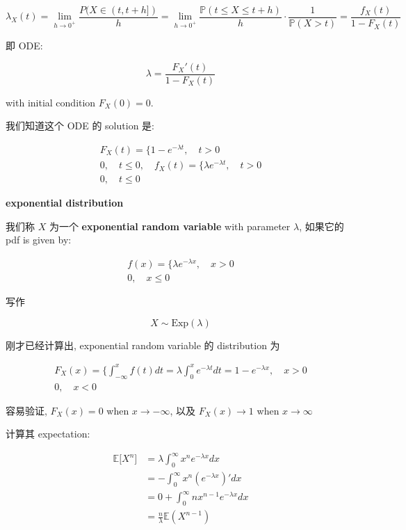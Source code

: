 \documentclass{qlnotes-export}
\begin{document}
\[\lambda_{X}(t) = \lim\limits_{h\rightarrow 0^{+}}\frac{P(X \in (t,t + h\rbrack)}{h} = \lim\limits_{h\rightarrow 0^{+}}\frac{{\mathbb{P}}(t \leq X \leq t + h)}{h} \cdot \frac{1}{{\mathbb{P}}(X > t)} = \frac{f_{X}(t)}{1 - F_{X}(t)}\]

即 ODE:

\[\lambda = \frac{F_{X}'(t)}{1 - F_{X}(t)}\]

with initial condition \(F_{X}(0) = 0\).

我们知道这个 ODE 的 solution 是:

\[\begin{matrix}
{F_{X}(t) = \{ 1 - e^{- \lambda t},\quad t > 0} \\
{0,\quad t \leq 0,\quad f_{X}(t) = \{\lambda e^{- \lambda t},\quad t > 0} \\
{0,\quad t \leq 0}
\end{matrix}\]

\begin{definition}{\protect{}\label{kn-exponential-distribution}{\textbf{exponential
distribution}}}

我们称 \(X\) 为一个 \textbf{exponential random variable} with parameter \(\lambda\), 如果它的 pdf is given by:

\[\begin{matrix}
{f(x) = \{\lambda e^{- \lambda x},\quad x > 0} \\
{0,\quad x \leq 0}
\end{matrix}\]

写作

\[X \sim \text{Exp}(\lambda)\]

\end{definition}

刚才已经计算出, exponential random variable 的 distribution 为

\[\begin{matrix}
{F_{X}(x) = \{\int_{- \infty}^{x}f(t) dt = \lambda\int_{0}^{x}e^{- \lambda t} dt = 1 - e^{- \lambda x},\quad x > 0} \\
{0,\quad x < 0}
\end{matrix}\]

容易验证, \(F_{X}(x) = 0\) when \(x\rightarrow - \infty\), 以及 \(F_{X}(x)\rightarrow 1\) when \(x\rightarrow\infty\)

计算其 expectation:

\[\begin{matrix}
{{\mathbb{E}}\lbrack X^{n}\rbrack} & {= \lambda\int_{0}^{\infty}x^{n}e^{- \lambda x} dx} \\
 & {= - \int_{0}^{\infty}x^{n}(e^{- \lambda x})' dx} \\
 & {= 0 + \int_{0}^{\infty}nx^{n - 1}e^{- \lambda x} dx} \\
 & {= \frac{n}{\lambda}{\mathbb{E}}(X^{n - 1})}
\end{matrix}\]
\end{document}
